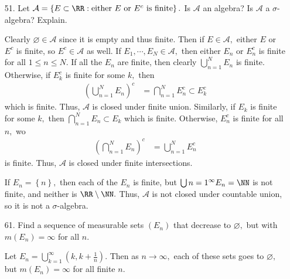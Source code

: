 \documentclass{article}
\begin{document}
\begin{itemize}
\begin{enumerate}[(a)]
		\end{enumerate}

	\item[51.] Let $\mathcal A=\left\{ E\subset\RR:\text{either }E\text{ or } E^c\text{ is finite} \right\}.$ Is $\mathcal A$ an algebra? Is $\mathcal A$ a $\sigma$-algebra? Explain.
		\begin{soln}
			Clearly $\varnothing\in \mathcal A$ since it is empty and thus finite. Then if $E\in\mathcal A,$ either $E$ or $E^c$ is finite, so $E^c\in\mathcal A$ as well. If $E_1, \cdots, E_N\in\mathcal A,$ then either $E_n$ or $E_n^c$ is finite for all $1\le n\le N.$ If all the $E_n$ are finite, then clearly $\bigcup_{n=1}^N E_n$ is finite. Otherwise, if $E_k^c$ is finite for some $k,$ then
			\begin{align*}
				\left( \bigcup_{n=1}^N E_n \right)^c &= \bigcap_{n=1}^N E_n^c \subset E_k^c
			\end{align*}
			which is finite. Thus, $\mathcal A$ is closed under finite union. Similarly, if $E_k$ is finite for some $k,$ then $\bigcap_{n=1}^N E_n\subset E_k$ which is finite. Otherwise, $E_n^c$ is finite for all $n,$ wo
			\begin{align*}
				\left( \bigcap_{n=1}^N E_n \right)^c &= \bigcup_{n=1}^N E_n^c
			\end{align*}
			is finite. Thus, $\mathcal A$ is closed under finite intersections. 

			If $E_n=\left\{ n \right\},$ then each of the $E_n$ is finite, but $\bigcup{n=1}^\infty E_n=\NN$ is not finite, and neither is $\RR\setminus\NN.$ Thus, $\mathcal A$ is not closed under countable union, so it is not a $\sigma$-algebra.
		\end{soln}

	\item[61.] Find a sequence of measurable sets $(E_n)$ that decrease to $\varnothing,$ but with $m(E_n)=\infty$ for all $n.$
		\begin{soln}
			Let $E_n=\bigcup_{k=1}^\infty \left( k, k+\frac{1}{n} \right).$ Then as $n\to\infty,$ each of these sets goes to $\varnothing,$ but $m(E_n)=\infty$ for all finite $n.$
		\end{soln}


\end{itemize}
\end{document}
